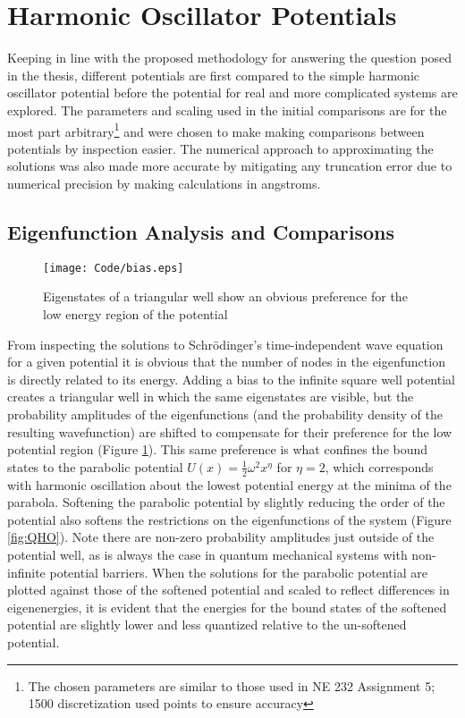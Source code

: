 \documentclass[11pt]{article}
\begin{document}
\section{Harmonic Oscillator Potentials}

Keeping in line with the proposed methodology for answering the question posed in the thesis, different potentials are first compared to the simple harmonic oscillator potential before the potential for real and more complicated systems are explored. The parameters and scaling used in the initial comparisons are for the most part arbitrary\footnote{The chosen parameters are similar to those used in NE 232 Assignment 5; 1500 discretization used points to ensure accuracy} and were chosen to make making comparisons between potentials by inspection easier. The numerical approach to approximating the solutions was also made more accurate by mitigating any truncation error due to numerical precision by making calculations in angstroms.

\subsection{Eigenfunction Analysis and Comparisons}

\begin{figure}[h]
\begin{center}
\texttt{[image: Code/bias.eps]}
\caption[bias plot]{ Eigenstates of a triangular well show an obvious preference for the low energy region of the potential}
\label{fig:bias}
\end{center}
\end{figure}

From inspecting the solutions to Schr\"{o}dinger's time-independent wave equation for a given potential it is obvious that the number of nodes in the eigenfunction is directly related to its energy. Adding a bias to the infinite square well potential creates a triangular well in which the same eigenstates are visible, but the probability amplitudes of the eigenfunctions (and the probability density of the resulting wavefunction) are shifted to compensate for their preference for the low potential region (Figure \ref{fig:bias}). This same preference is what confines the bound states to the parabolic potential $U(x)=\frac{1}{2}\omega^2 x^\eta$ for $\eta=2$, which corresponds with harmonic oscillation about the lowest potential energy at the minima of the parabola. Softening the parabolic potential by slightly reducing the order of the potential also softens the restrictions on the eigenfunctions of the system (Figure \ref{fig:QHO}).  Note there are non-zero probability amplitudes just outside of the potential well, as is always the case in quantum mechanical systems with non-infinite potential barriers. When the solutions for the parabolic potential are plotted against those of the softened potential and scaled to reflect differences in eigenenergies, it is evident that the energies for the bound states of the softened potential are slightly lower and less quantized relative to the un-softened potential. 
\end{document}
